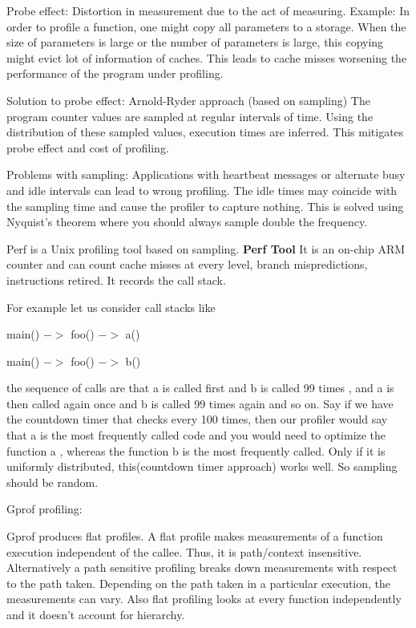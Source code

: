 \documentclass[twoside]{article}
\begin{document}
Probe effect: Distortion in measurement due to the act of measuring.
Example: In order to profile a function, one might copy all parameters to a storage. When the size of parameters
is large or the number of parameters is large, this copying might evict lot of information of caches. This leads
to cache misses worsening the performance of the program under profiling.

Solution to probe effect: Arnold-Ryder approach (based on sampling)
The program counter values are sampled at regular intervals of time. Using the distribution of these sampled values, execution times are inferred. This mitigates probe effect and cost of profiling.

Problems with sampling: Applications with heartbeat messages or alternate busy and idle intervals can lead to wrong profiling. The idle times may coincide with the sampling time and cause the profiler to capture nothing. This is solved using Nyquist's theorem where you should always sample double the frequency. 


Perf is a Unix profiling tool based on sampling. 
\textbf{Perf Tool}
It is an on-chip ARM counter and can count cache misses at every level, branch mispredictions, instructions retired. It records the call stack. 

For example let us consider call stacks like 

main() \(->\) foo() \(->\) a()

main() \(->\) foo() \(->\) b()

the sequence of calls are that a is called first and b is called 99 times , and a is then called again once and b is called 99 times again and so on. Say if we have the countdown timer that checks every 100 times, then our profiler would say that a is the most frequently called code and you would need to optimize the function a , whereas the function b is the most frequently called. Only if it is uniformly distributed, this(countdown timer approach) works well. So sampling should be random.



Gprof profiling:

Gprof produces flat profiles. A flat profile makes measurements of a function execution independent of the
callee. Thus, it is path/context insensitive. Alternatively a path sensitive profiling breaks down measurements
with respect to the path taken. Depending on the path taken in a particular execution, the measurements can
vary. Also flat profiling looks at every function independently and it doesn't account for hierarchy.
\end{document}
